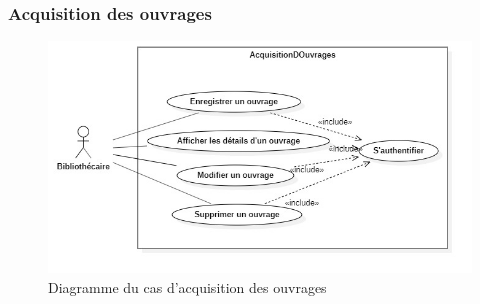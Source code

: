 \subsubsection{Acquisition des ouvrages} 
\begin{figure}[h]
        \centering
        \includegraphics[width=1\textwidth]{acquisitionDesOuvragesUseCase}
        \caption{Diagramme du cas d'acquisition des ouvrages}
        \label{image-acquisitionDesOuvragesUseCase}
        \end{figure}
